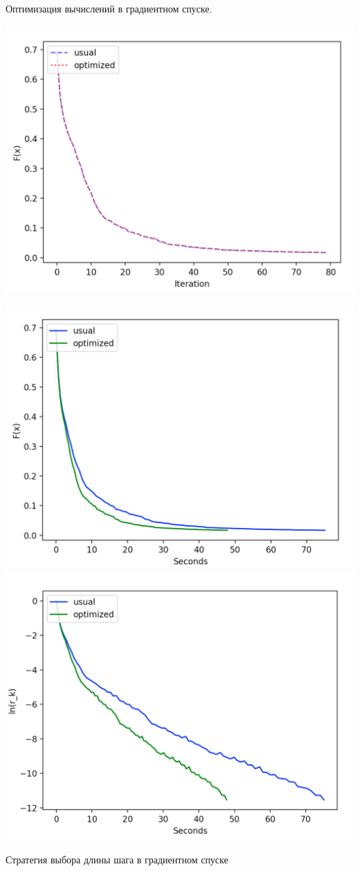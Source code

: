 \documentclass{article}
\theoremstyle{definition}
\theoremstyle{remark}
\begin{document}
Оптимизация вычислений в градиентном спуске.


\includegraphics[width=0.6 \textwidth]{41.png}


\includegraphics[width=0.6 \textwidth]{42.png}
\includegraphics[width=0.6 \textwidth]{43.png}



Стратегия выбора длины шага в градиентном спуске
\end{document}
